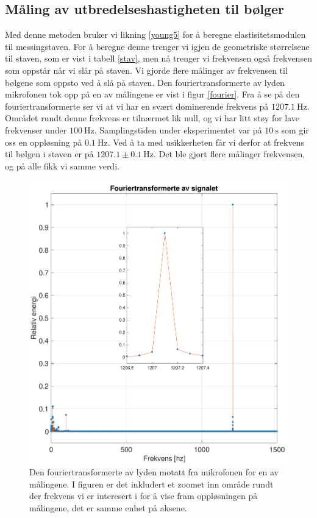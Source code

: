 \documentclass[%
 reprint,
 amsmath,amssymb,
 aps,
 norsk,
 booktabs
]{revtex4-1}
\begin{document}
\subsection{Måling av utbredelseshastigheten til bølger}
Med denne metoden bruker vi likning \eqref{young5} for å beregne elastisitetsmodulen til messingstaven. For å beregne denne trenger vi igjen de geometriske størrelsene til staven, som er vist i tabell \vref{stav}, men nå trenger vi frekvensen også frekvensen som oppstår når vi slår på staven.
Vi gjorde flere målinger av frekvensen til bølgene som oppsto ved å slå på staven. Den fouriertransformerte av lyden mikrofonen tok opp på en av målingene er vist i figur \vref{fourier}. Fra å se på den fouriertransformerte ser vi at vi har en svært dominerende frekvens på $\SI{1207.1}{\hertz}$. Området rundt denne frekvens er tilnærmet lik null, og vi har litt støy for lave frekvenser under $\SI{100}{\hertz}$. Samplingstiden under eksperimentet var på $\SI{10}{\second}$ som gir oss en oppløsning på $\SI{0.1}{\hertz}$. Ved å ta med usikkerheten får vi derfor at frekvens til bølgen i staven er på $1207.1\pm\SI{0.1}{\hertz}$. Det ble gjort flere målinger frekvensen, og på alle fikk vi samme verdi.
\begin{figure}[h!]
  \centering
  \includegraphics[scale=0.4]{fourier_c.pdf}
  \caption{Den fouriertransformerte av lyden motatt fra mikrofonen for en av målingene. I figuren er det inkludert et zoomet inn område rundt der frekvens vi er interesert i for å vise fram oppløsningen på målingene, det er samme enhet på aksene.}
  \label{fourier}
\end{figure}
\end{document}
